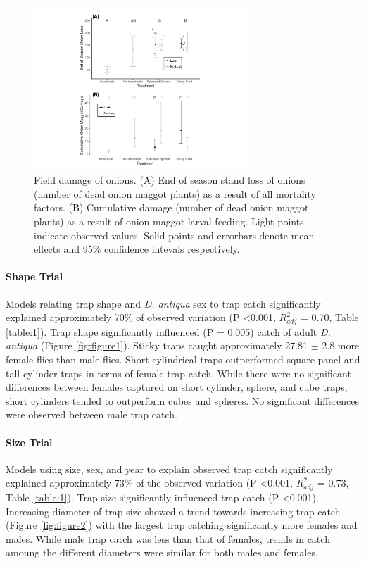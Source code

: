 \documentclass[alpha-refs]{wiley-article}
\begin{document}
\begin{figure}[bt]
\centering
\includegraphics[width = 8cm]{figures/final-figures/figure-4.pdf}
\caption{Field damage of onions.  (A) End of season stand loss of onions (number of dead onion maggot plants) as a result of all mortality factors.  (B) Cumulative damage (number of dead onion maggot plants) as a result of onion maggot larval feeding.  Light points indicate observed values.  Solid points and errorbars denote mean effects and 95\% confidence intevals respectively.   }
\label{fig:figure4}
\end{figure}



\paragraph{Shape Trial} Models relating trap shape and \textit{D. antiqua} sex to trap catch significantly explained approximately 70\% of observed variation (P \textless 0.001, $R^2_{adj}$ = 0.70, Table \ref{table:1}).  Trap shape significantly influenced (P = 0.005) catch of adult \textit{D. antiqua} (Figure \ref{fig:figure1}).  Sticky traps caught approximately 27.81 $\pm$ 2.8 more female flies than male flies.  Short cylindrical traps outperformed square panel and tall cylinder traps in terms of female trap catch.  While there were no significant differences between females captured on short cylinder, sphere, and cube traps, short cylinders tended to outperform cubes and spheres.  No significant differences were observed between male trap catch.  


\paragraph{Size Trial} Models using size, sex, and year to explain observed trap catch significantly explained approximately 73\% of the observed variation (P \textless 0.001, $R^2_{adj}$ = 0.73, Table \ref{table:1}).  Trap size significantly influenced trap catch (P \textless 0.001).  Increasing diameter of trap size showed a trend towards increasing trap catch (Figure \ref{fig:figure2}) with the largest trap catching significantly more females and males.  While male trap catch was less than that of females, trends in catch amoung the different diameters were similar for both males and females.  
\end{document}
